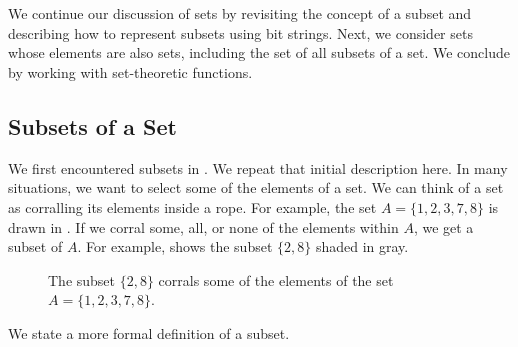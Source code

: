 \section{\secsubsets}
\label{sec_subsets}

We continue our discussion of sets by revisiting the concept of a subset and describing how to represent subsets using bit strings. Next, we consider sets whose elements are also sets, including the set of all subsets of a set.  We conclude by working with set-theoretic functions.


\newcommand{\subsubsets}{Subsets of a Set}
\subsection{\subsubsets}
\label{sub_subsets}

We first encountered subsets in .  We repeat that initial description here.  In many situations, we want to select some of the elements of a set.  We can think of a set as corralling its elements inside a rope.  For example, the set $A=\{1,2,3,7,8\}$ is drawn in .  If we corral some, all, or none of the elements within $A$, we get a subset of $A$.  For example,  shows the subset $\{2,8\}$ shaded in gray.

\begin{figure}[ht]
    \centering
    
    \caption{The subset $\{2,8\}$ corrals some of the elements of the set $A=\{1,2,3,7,8\}$.}
        \label{fig_subset_corral_again}
\end{figure}

We state a more formal definition of a subset.

